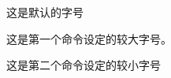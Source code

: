 \documentclass{ctexart}
\newcommand{\setsizeone}{
  \renewcommand{\normalsize}{\fontsize{28}{32}\selectfont}
  \renewcommand{\small}{\fontsize{24}{14}\selectfont}
  \renewcommand{\large}{\fontsize{32}{36}\selectfont}
  \renewcommand{\Large}{\fontsize{36}{44}\selectfont}
}
\newcommand{\setsizetwo}{
  \renewcommand{\normalsize}{\fontsize{10}{12}\selectfont}
  \renewcommand{\small}{\fontsize{8}{10}\selectfont}
  \renewcommand{\large}{\fontsize{12}{14}\selectfont}
  \renewcommand{\Large}{\fontsize{14}{17}\selectfont}
}
\begin{document}
这是默认的字号

\setsizeone
这是第一个命令设定的较大字号。

\setsizetwo
这是第二个命令设定的较小字号
\end{document}

